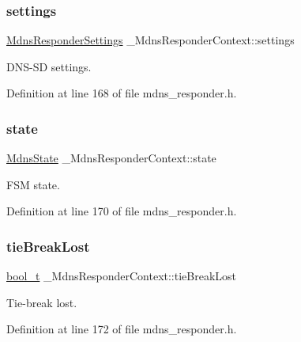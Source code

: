 \subsubsection{\texorpdfstring{settings}{settings}}
{\footnotesize\ttfamily \hyperlink{structMdnsResponderSettings}{Mdns\+Responder\+Settings} \+\_\+\+Mdns\+Responder\+Context\+::settings}



D\+N\+S-\/\+SD settings. 



Definition at line 168 of file mdns\+\_\+responder.\+h.

\mbox{\label{struct__MdnsResponderContext_ad92f6902b160264bf0ad8008065bc17c}} 
\subsubsection{\texorpdfstring{state}{state}}
{\footnotesize\ttfamily \hyperlink{mdns__responder_8h_a96ee67ecc8252ba576e72c97cd8f7fd3}{Mdns\+State} \+\_\+\+Mdns\+Responder\+Context\+::state}



F\+SM state. 



Definition at line 170 of file mdns\+\_\+responder.\+h.

\mbox{\label{struct__MdnsResponderContext_abc3c2d37ce14867973548b15ec0a59ab}} 
\subsubsection{\texorpdfstring{tie\+Break\+Lost}{tieBreakLost}}
{\footnotesize\ttfamily \hyperlink{compiler__port_8h_a812d16e5494522586b3784e55d479912}{bool\+\_\+t} \+\_\+\+Mdns\+Responder\+Context\+::tie\+Break\+Lost}



Tie-\/break lost. 



Definition at line 172 of file mdns\+\_\+responder.\+h.

